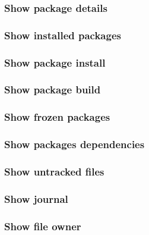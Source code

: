 % 
%
\subsubsection{Show package details}


\subsubsection{Show installed packages}


\subsubsection{Show package install}


\subsubsection{Show package build}


\subsubsection{Show frozen packages}


\subsubsection{Show packages dependencies}


\subsubsection{Show untracked files}


\subsubsection{Show journal}


\subsubsection{Show file owner}


